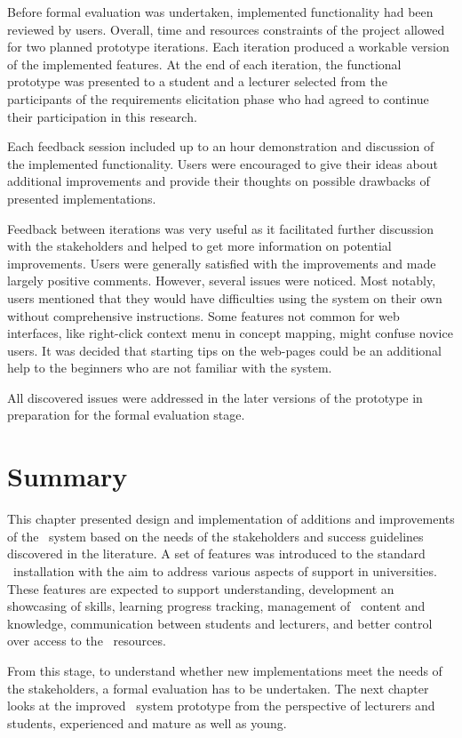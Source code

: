 Before formal evaluation was undertaken, implemented functionality had been
reviewed by users. Overall, time and resources constraints of the project
allowed for two planned prototype iterations. Each iteration produced a workable
version of the implemented features. At the end of each iteration, the
functional prototype was presented to a student and a lecturer selected from the
participants of the requirements elicitation phase who had agreed to continue
their participation in this research.

Each feedback session included up to an hour demonstration and discussion of the
implemented functionality. Users were encouraged to give their ideas about
additional improvements and provide their thoughts on possible drawbacks of
presented implementations.

Feedback between iterations was very useful as it facilitated further discussion
with the stakeholders and helped to get more information on potential
improvements. Users were generally satisfied with the improvements and made
largely positive comments. However, several issues were noticed. Most notably,
users mentioned that they would have difficulties using the system on their
own without comprehensive instructions. Some features not common for web
interfaces, like right-click context menu in concept mapping, might confuse
novice users. It was decided that starting tips on the web-pages could be an
additional help to the beginners who are not familiar with the system.

All discovered issues were addressed in the later versions of the prototype
in preparation for the formal evaluation stage.

\section{Summary}

This chapter presented design and implementation of additions and improvements
of the \ep~system based on the needs of the stakeholders and \LLLs success
guidelines discovered in the literature. A set of features was introduced to
the standard \ep~installation with the aim to address various aspects of \LLLs
support in universities. These features are expected to support understanding,
development an showcasing of \LLLs skills, learning progress tracking,
management of \ep~content and knowledge, communication between students and
lecturers, and better control over access to the \ep~resources.

From this stage, to understand whether new implementations meet the needs of
the stakeholders, a formal evaluation has to be undertaken. The next chapter
looks at the improved \ep~system prototype from the perspective of lecturers
and students, experienced and mature as well as young.
